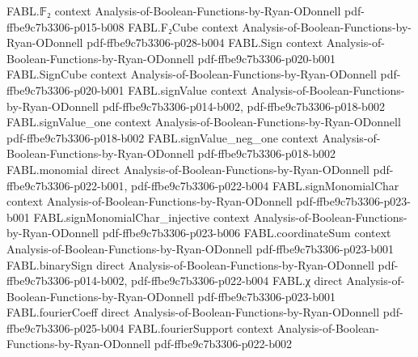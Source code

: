\begin{theorem}
\label{FABL.osssCounterexample_violates_real_valued_extension}
\leanok
{}
\proofstep
  {FABL.𝔽₂}
  {context}
  {Analysis-of-Boolean-Functions-by-Ryan-ODonnell}
  {pdf-ffbe9c7b3306-p015-b008}
\proofstep
  {FABL.F₂Cube}
  {context}
  {Analysis-of-Boolean-Functions-by-Ryan-ODonnell}
  {pdf-ffbe9c7b3306-p028-b004}
\proofstep
  {FABL.Sign}
  {context}
  {Analysis-of-Boolean-Functions-by-Ryan-ODonnell}
  {pdf-ffbe9c7b3306-p020-b001}
\proofstep
  {FABL.SignCube}
  {context}
  {Analysis-of-Boolean-Functions-by-Ryan-ODonnell}
  {pdf-ffbe9c7b3306-p020-b001}
\proofstep
  {FABL.signValue}
  {context}
  {Analysis-of-Boolean-Functions-by-Ryan-ODonnell}
  {pdf-ffbe9c7b3306-p014-b002,
    pdf-ffbe9c7b3306-p018-b002}
\proofstep
  {FABL.signValue_one}
  {context}
  {Analysis-of-Boolean-Functions-by-Ryan-ODonnell}
  {pdf-ffbe9c7b3306-p018-b002}
\proofstep
  {FABL.signValue_neg_one}
  {context}
  {Analysis-of-Boolean-Functions-by-Ryan-ODonnell}
  {pdf-ffbe9c7b3306-p018-b002}
\proofstep
  {FABL.monomial}
  {direct}
  {Analysis-of-Boolean-Functions-by-Ryan-ODonnell}
  {pdf-ffbe9c7b3306-p022-b001,
    pdf-ffbe9c7b3306-p022-b004}
\proofstep
  {FABL.signMonomialChar}
  {context}
  {Analysis-of-Boolean-Functions-by-Ryan-ODonnell}
  {pdf-ffbe9c7b3306-p023-b001}
\proofstep
  {FABL.signMonomialChar_injective}
  {context}
  {Analysis-of-Boolean-Functions-by-Ryan-ODonnell}
  {pdf-ffbe9c7b3306-p023-b006}
\proofstep
  {FABL.coordinateSum}
  {context}
  {Analysis-of-Boolean-Functions-by-Ryan-ODonnell}
  {pdf-ffbe9c7b3306-p023-b001}
\proofstep
  {FABL.binarySign}
  {direct}
  {Analysis-of-Boolean-Functions-by-Ryan-ODonnell}
  {pdf-ffbe9c7b3306-p014-b002,
    pdf-ffbe9c7b3306-p022-b004}
\proofstep
  {FABL.χ}
  {direct}
  {Analysis-of-Boolean-Functions-by-Ryan-ODonnell}
  {pdf-ffbe9c7b3306-p023-b001}
\proofstep
  {FABL.fourierCoeff}
  {direct}
  {Analysis-of-Boolean-Functions-by-Ryan-ODonnell}
  {pdf-ffbe9c7b3306-p025-b004}
\proofstep
  {FABL.fourierSupport}
  {context}
  {Analysis-of-Boolean-Functions-by-Ryan-ODonnell}
  {pdf-ffbe9c7b3306-p022-b002}
\proofstep

\end{theorem}
